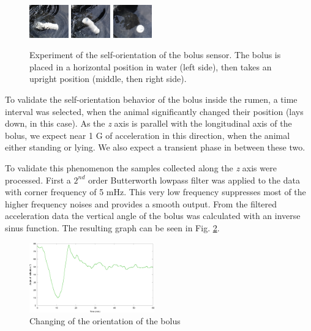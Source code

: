 \documentclass[conference]{IEEEtran}
\begin{document}
\begin{figure}[htbp]
  \centerline{
    \includegraphics[width=0.15\textwidth]{fig/kfj_1.png}
    \includegraphics[width=0.15\textwidth]{fig/kfj_2.png}
    \includegraphics[width=0.15\textwidth]{fig/kfj_3.png}
  }
  \caption{Experiment of the self-orientation of the bolus sensor. The
  bolus is placed in a horizontal position in water (left side), then takes
  an upright position (middle, then right side).}
  \label{self-orientation-experiment}
\end{figure}

To validate the self-orientation behavior of the bolus inside the rumen, a time
interval was selected, when the animal significantly changed their position
(lays down, in this case). As the \emph{z} axis is parallel with the
longitudinal axis of the bolus, we expect near 1 G of acceleration in this
direction, when the animal either standing or lying. We also expect a transient
phase in between these two.

To validate this phenomenon the samples collected along the \emph{z} axis were
processed. First a $2^{nd}$ order Butterworth lowpass filter was applied to the
data with corner frequency of 5 mHz. This very low frequency suppresses most of
the higher frequency noises and provides a smooth output. From the filtered
acceleration data the vertical angle of the bolus was calculated with an
inverse sinus function. The resulting graph can be seen in Fig.
\ref{auto-orientation}.

\begin{figure}[htbp]
\centerline{\includegraphics[width=0.48\textwidth]{fig/auto-orientation.png}}
  \caption{Changing of the orientation of the bolus}
\label{auto-orientation}
\end{figure}
\end{document}
